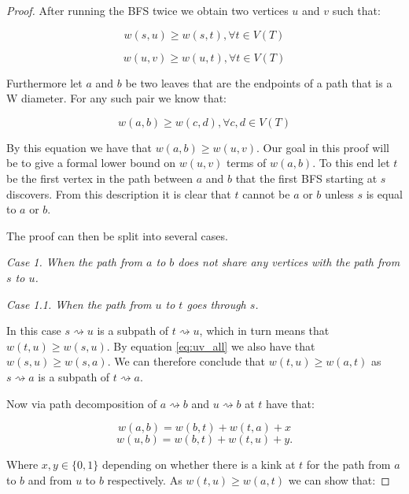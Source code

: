 \begin{proof}
After running the BFS twice we obtain two vertices $u$ and $v$ such that:

\begin{equation}
    \label{eq:su_all}
    w(s, u) \ge w(s, t), \forall t \in V(T)
\end{equation}

\begin{equation}
    \label{eq:uv_all}
    w(u, v) \ge w(u, t), \forall t \in V(T)
\end{equation}

Furthermore let $a$ and $b$ be two leaves that are the endpoints of a path that is a W diameter. For any such pair we know that:

\begin{equation}
    \label{eq:ab_all}
    w(a, b) \ge w(c, d), \forall c, d \in V(T)
\end{equation}

By this equation we have that $w(a, b) \ge w(u, v)$. Our goal in this proof will be to give a formal lower bound on $w(u, v)$ terms of $w(a, b)$. To this end let $t$ be the first vertex in the path between $a$ and $b$ that the first BFS starting at $s$ discovers. From this description it is clear that $t$ cannot be $a$ or $b$ unless $s$ is equal to $a$ or $b$.

The proof can then be split into several cases. \linebreak

{\em Case 1. When the path from $a$ to $b$ does not share any vertices with the path from $s$ to $u$.}

{\em Case 1.1. When the path from $u$ to $t$ goes through $s$.}

In this case $s \rightsquigarrow u$ is a subpath of $t \rightsquigarrow u$, which in turn means that $w(t, u) \ge w(s, u)$. By equation \ref{eq:uv_all} we also have that $w(s, u) \ge w(s, a)$. We can therefore conclude that $w(t, u) \ge w(a, t)$ as $s \rightsquigarrow a$ is a subpath of $t \rightsquigarrow a$.

Now via path decomposition of $a \rightsquigarrow b$ and $u \rightsquigarrow b$ at $t$ have that:

$$ w(a, b) = w(b, t) + w(t, a) + x  $$
$$ w(u, b) = w(b, t) + w(t, u) + y .$$

Where $x, y \in \{0, 1\}$ depending on whether there is a kink at $t$ for the path from $a$ to $b$ and from $u$ to $b$ respectively. As $w(t, u) \ge w(a, t)$ we can show that:



\end{proof}
